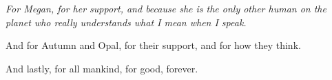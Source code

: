 %
%
\cleardoublepage
\thispagestyle{empty}
\null\vfill
\begin{center}
  \begin{minipage}{0.72\textwidth}
    \centering
    \itshape
    For Megan, for her support, and because she is the only other human on the
    planet who really understands what I mean when I speak.

    \vspace{1.6em}

    And for Autumn and Opal, for their support, and for how they think.

    \vspace{1.6em}

    And lastly, for all mankind, for good, forever.
  \end{minipage}
\end{center}
\vfill\vfill
\cleardoublepage
